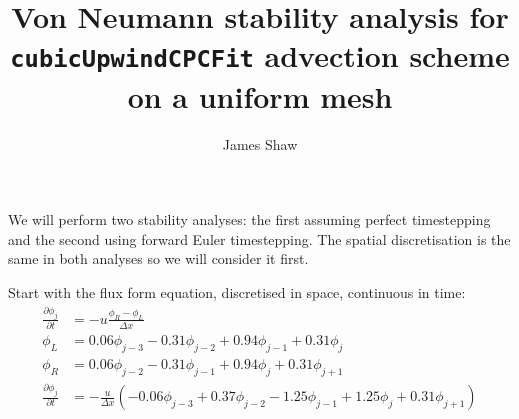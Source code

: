 \documentclass{article} \usepackage{fullpage}
\title{Von Neumann stability analysis for \texttt{cubicUpwindCPCFit} advection scheme on a uniform mesh}
\author{James Shaw}
\begin{document}
\maketitle

We will perform two stability analyses: the first assuming perfect timestepping and the second using forward Euler timestepping.
The spatial discretisation is the same in both analyses so we will consider it first.

Start with the flux form equation, discretised in space, continuous in time:
\begin{align}
\frac{\partial \phi_j}{\partial t} &= - u \frac{\phi_R - \phi_L}{\Delta x} \\
\phi_L &= 0.06 \phi_{j-3} - 0.31 \phi_{j-2} + 0.94 \phi_{j-1} + 0.31 \phi_j \\
\phi_R &= 0.06 \phi_{j-2} - 0.31 \phi_{j-1} + 0.94 \phi_j + 0.31 \phi_{j+1} \\
\frac{\partial \phi_j}{\partial t} &= - \frac{u}{\Delta x} \left( -0.06 \phi_{j-3} + 0.37 \phi_{j-2} - 1.25 \phi_{j-1} + 1.25 \phi_j + 0.31 \phi_{j+1} \right) \label{eqn:continuous-time}
\end{align}
\end{document}
